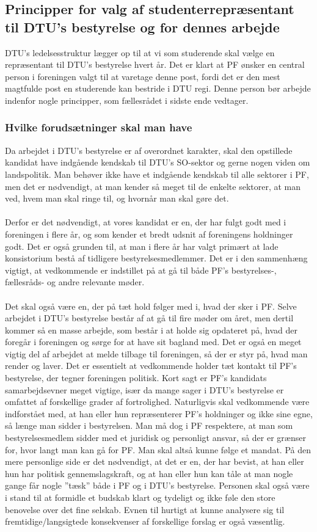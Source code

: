 \subsection{Principper for valg af studenterrepræsentant til DTU’s bestyrelse og for dennes arbejde}
DTU’s ledelsesstruktur lægger op til at vi som studerende skal vælge en repræsentant til DTU’s bestyrelse hvert år. Det er klart at PF ønsker en central person i foreningen valgt til at varetage denne post, fordi det er den mest magtfulde post en studerende kan bestride i DTU regi. Denne person bør arbejde indenfor nogle principper, som fællesrådet i sidste ende vedtager. 

\subsubsection{Hvilke forudsætninger skal man have}
Da arbejdet i DTU’s bestyrelse er af overordnet karakter, skal den opstillede kandidat have indgående kendskab til DTU’s SO-sektor og gerne nogen viden om landspolitik. Man behøver ikke have et indgående kendskab til alle sektorer i PF, men det er nødvendigt, at man kender så meget til de enkelte sektorer, at man ved, hvem man skal ringe til, og hvornår man skal gøre det.\\
\\
Derfor er det nødvendigt, at vores kandidat er en, der har fulgt godt med i foreningen i flere år, og som kender et bredt udsnit af foreningens holdninger godt. Det er også grunden til, at man i flere år har valgt primært at lade konsistorium bestå af tidligere bestyrelsesmedlemmer. Det er i den sammenhæng vigtigt, at vedkommende er indstillet på at gå til både PF's bestyrelses-, fællesråds- og andre relevante møder.\\
\\
Det skal også være en, der på tæt hold følger med i, hvad der sker i PF. Selve arbejdet i DTU’s bestyrelse består af at gå til fire møder om året, men dertil kommer så en masse arbejde, som består i at holde sig opdateret på, hvad der foregår i foreningen og sørge for at have sit bagland med. Det er også en meget vigtig del af arbejdet at melde tilbage til foreningen, så der er styr på, hvad man render og laver. Det er essentielt at vedkommende holder tæt kontakt til PF’s bestyrelse, der tegner foreningen politisk. Kort sagt er PF’s kandidats samarbejdsevner meget vigtige, især da mange sager i DTU’s bestyrelse er omfattet af forskellige grader af fortrolighed. Naturligvis skal vedkommende være indforstået med, at han eller hun repræsenterer PF’s holdninger og ikke sine egne, så længe man sidder i bestyrelsen. Man må dog i PF respektere, at man som bestyrelsesmedlem sidder med et juridisk og personligt ansvar, så der er grænser for, hvor langt man kan gå for PF. Man skal altså kunne følge et mandat. På den mere personlige side er det nødvendigt, at det er en, der har bevist, at han eller hun har politisk gennemslagskraft, og at han eller hun kan tåle at man nogle gange får nogle ”tæsk” både i PF og i DTU’s bestyrelse. Personen skal også være i stand til at formidle et budskab klart og tydeligt og ikke føle den store benovelse over det fine selskab. Evnen til hurtigt at kunne analysere sig til fremtidige/langsigtede konsekvenser af forskellige forslag er også væsentlig. 

